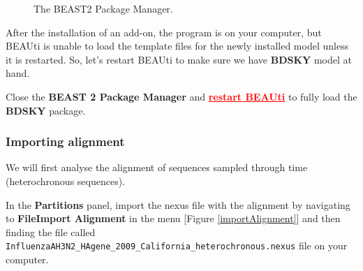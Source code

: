 \documentclass[11pt]{article}
\begin{document}
\begin{figure}[h!]
\centering
{}
\caption{\small The BEAST2 Package Manager.}
\label{packageManage2}
\end{figure}

After the installation of an add-on, the program is on your computer, but BEAUti is unable to load the template files for the newly installed model unless it is restarted. So, let's restart BEAUti to make sure we have \textbf{BDSKY} model at hand.

\begin{framed}
Close the \textbf{BEAST 2 Package Manager} and {\textcolor{red}{\underline{\bf restart BEAUti}}} to fully load the \textbf{BDSKY} package.
\end{framed}



\newpage
\bigskip
\subsubsection{Importing alignment}\label{Importing alignment}

We will first analyse the alignment of sequences sampled through time (heterochronous sequences). 
 
\begin{framed}
In the \textbf{Partitions} panel, import the nexus file with the alignment by navigating to \textbf{File\textrightarrow Import Alignment} in the menu [Figure \ref{importAlignment}] and then finding the file called \newline \texttt{InfluenzaAH3N2\_HAgene\_2009\_California\_heterochronous.nexus}  file on your computer.
\end{framed}
\end{document}
